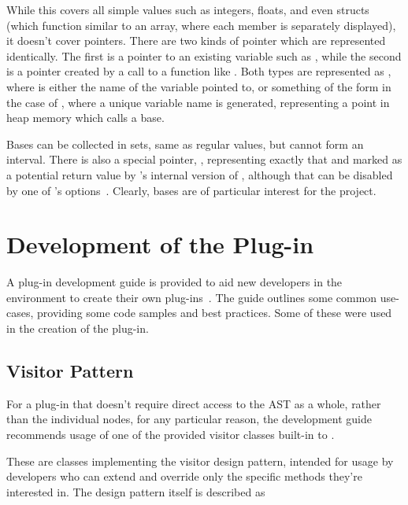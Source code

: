 While this covers all simple values such as integers, floats, and even structs (which function similar to an array, where each member is separately displayed), it doesn't cover pointers. There are two kinds of pointer which are represented identically. The first is a pointer to an existing variable such as , while the second is a pointer created by a call to a function like \malloc{}. Both types are represented as , where  is either the name of the variable pointed to, or something of the form  in the case of \malloc{}, where a unique variable name is generated, representing a point in heap memory which  calls a base.

Bases can be collected in sets, same as regular values, but cannot form an interval. There is also a special pointer, , representing exactly that and marked as a potential return value by 's internal version of \malloc{}, although that can be disabled by one of 's options~\cite{framamalloc}. Clearly, bases are of particular interest for the project.

\section{Development of the  Plug-in}

A plug-in development guide is provided to aid new developers in the  environment to create their own plug-ins~\cite{framaplug}. The guide outlines some common use-cases, providing some code samples and best practices. Some of these were used in the creation of the  plug-in.

\subsection{Visitor Pattern}

For a plug-in that doesn't require direct access to the AST as a whole, rather than the individual nodes, for any particular reason, the development guide recommends usage of one of the provided visitor classes built-in to .

These are classes implementing the visitor design pattern, intended for usage by developers who can extend and override only the specific methods they're interested in. The design pattern itself is described as

